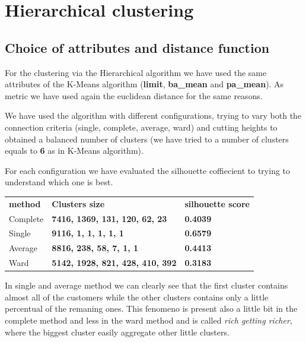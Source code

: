\section{Hierarchical clustering}
\subsection{Choice of attributes and distance function}

For the clustering via the Hierarchical algorithm we have used the same attributes of the K-Means algorithm (\textbf{limit}, \textbf{ba\_mean} and \textbf{pa\_mean}). As metric we have used again the euclidean distance for the same reasons.

\smallskip

We have used the algorithm with different configurations, trying to vary both the connection criteria (single, complete, average, ward) and cutting heights to obtained a balanced number of clusters (we have tried to a number of clusters equals to \textbf{6} as in K-Means algorithm).

For each configuration we have evaluated the silhouette coffiecient to trying to understand which one is best.

\begin{table}[h]
\centering
\begin{adjustbox}{width=.5\textwidth}
\small
\begin{tabular}{lll}
\textbf{method}  & \textbf{Clusters size}                    & \textbf{silhouette score} \\ \rowcolor[HTML]{EFEFEF} 
 Complete        & \textbf{7416, 1369, 131, 120, 62, 23}     & \textbf{0.4039}           \\
 Single          & \textbf{9116, 1, 1, 1, 1, 1}              & \textbf{0.6579}           \\ \rowcolor[HTML]{EFEFEF} 
 Average         & \textbf{8816, 238, 58, 7, 1, 1}           & \textbf{0.4413}           \\
 Ward            & \textbf{5142, 1928, 821, 428, 410, 392}   & \textbf{0.3183}                          
\end{tabular}
\end{adjustbox}
\end{table}

In single and average method we can clearly see that the first cluster contains almost all of the customers while the other clusters contains only a little percentual of the remaning ones. This fenomeno is present also a little bit in the complete method and less in the ward method and is called \textit{rich
getting richer}, where the biggest cluster easily aggregate other little clusters.
 
